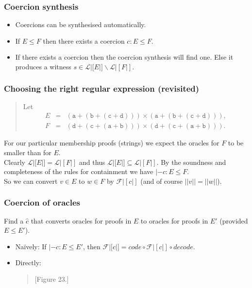 \documentclass[slidestop,compress,mathserif, xcolor=table]{beamer}
\begin{document}
\begin{frame}[c]
  \frametitle{Coercion synthesis}

  
  \begin{itemize}
  \item Coercions can be synthesised automatically.

  \item If $E \leq F$ then there exists a coercion $c : E \leq F$.

  \item If there exists a coercion then the coercion synthesis will find
    one. Else it produces a witness $s \in \mathcal{L}|[E|] \backslash
    \mathcal{L}|[F|]$.
  \end{itemize}


\end{frame}

\begin{frame}
  \frametitle{Choosing the right regular expression (revisited)}

  \begin{quote}
    Let
    \begin{eqnarray*}
      E &=& (\mathtt{a} + (\mathtt{b} + (\mathtt{c} + \mathtt{d}))) \times (\mathtt{a} + (\mathtt{b} + (\mathtt{c} + \mathtt{d}))),\\
      F &=& (\mathtt{d} + (\mathtt{c} + (\mathtt{a} + \mathtt{b}))) \times (\mathtt{d} + (\mathtt{c} + (\mathtt{a} + \mathtt{b}))).
    \end{eqnarray*}
  \end{quote}
  For our particular membership proofs (strings) we expect the oracles for $F$
  to be smaller than for $E$.\\[1em]

  Clearly $\mathcal{L}|[E|] = \mathcal{L}|[F|]$ and thus $\mathcal{L}|[E|]
  \subseteq \mathcal{L}|[F|]$. By the soundness and completeness of the rules
  for containment we have $|- c : E \leq F$.\\[1em]

  So we can convert $v \in E$ to $w \in F$ by $\mathcal{F}|[c|]$ (and of course
  $||v|| = ||w||$).
\end{frame}

\begin{frame}
  \frametitle{Coercion of oracles}

  Find a $\hat{c}$ that converts oracles for proofs in $E$ to oracles for proofs
  in $E'$ (provided $E \leq E'$).

    \begin{itemize}
    \item Naïvely: If $|- c : E \leq E'$, then $\mathcal{F}|[\hat{c}|] =
      code \circ \mathcal{F}|[c|] \circ decode$.
    \item Directly:
      \begin{quote}
        [Figure 23.]
      \end{quote}
    \end{itemize}
\end{frame}
\end{document}
